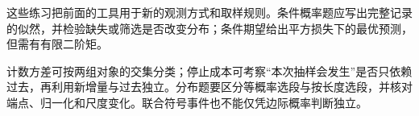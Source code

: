 这些练习把前面的工具用于新的观测方式和取样规则。条件概率题应写出完整记录的似然，并检验缺失或筛选是否改变分布；条件期望给出平方损失下的最优预测，但需有有限二阶矩。

计数方差可按两组对象的交集分类；停止成本可考察“本次抽样会发生”是否只依赖过去，再利用新增量与过去独立。分布题要区分等概率选段与按长度选段，并核对端点、归一化和尺度变化。联合符号事件也不能仅凭边际概率判断独立。
\par\smallskip
